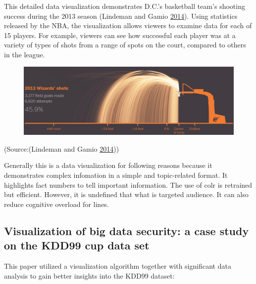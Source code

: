 \documentclass[]{book}
\begin{document}
This detailed data visualization demonstrates D.C.'s basketball team's
shooting success during the 2013 season (Lindeman and Gamio
\protect\hyperlink{ref-basketball}{2014}). Using statistics released by
the NBA, the visualization allows viewers to examine data for each of 15
players. For example, viewers can see how successful each player was at
a variety of types of shots from a range of spots on the court, compared
to others in the league.

\begin{figure}
\centering
\includegraphics{images/wizards_shooting.png}
\caption{}
\end{figure}

(Source:(Lindeman and Gamio \protect\hyperlink{ref-basketball}{2014}))

Generally this is a data visualization for following reasons because it
demonstrates complex infomation in a simple and topic-related format. It
highlights fact numbers to tell important information. The use of colr
is retrained but efficient. However, it is undefined that what is
targeted audience. It can also reduce cognitive overload for lines.

\subsection{Visualization of big data security: a case study on the
KDD99 cup data
set}\label{visualization-of-big-data-security-a-case-study-on-the-kdd99-cup-data-set}

This paper utilized a visualization algorithm together with significant
data analysis to gain better insights into the KDD99 dataset:
\end{document}

